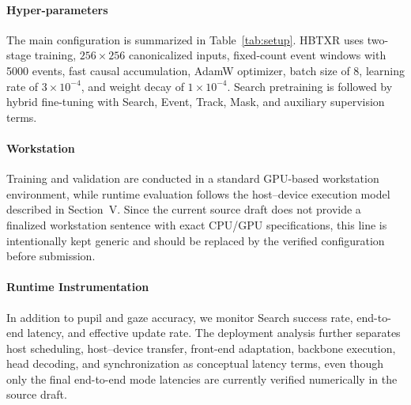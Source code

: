 \documentclass[journal]{IEEEtran}
\begin{document}
\paragraph*{Hyper-parameters}
The main configuration is summarized in Table~\ref{tab:setup}. HBTXR uses two-stage training, $256\times256$ canonicalized inputs, fixed-count event windows with 5000 events, fast causal accumulation, AdamW optimizer, batch size of 8, learning rate of $3\times10^{-4}$, and weight decay of $1\times10^{-4}$. Search pretraining is followed by hybrid fine-tuning with Search, Event, Track, Mask, and auxiliary supervision terms.

\paragraph*{Workstation}
Training and validation are conducted in a standard GPU-based workstation environment, while runtime evaluation follows the host--device execution model described in Section~V. Since the current source draft does not provide a finalized workstation sentence with exact CPU/GPU specifications, this line is intentionally kept generic and should be replaced by the verified configuration before submission.

\paragraph*{Runtime Instrumentation}
In addition to pupil and gaze accuracy, we monitor Search success rate, end-to-end latency, and effective update rate. The deployment analysis further separates host scheduling, host--device transfer, front-end adaptation, backbone execution, head decoding, and synchronization as conceptual latency terms, even though only the final end-to-end mode latencies are currently verified numerically in the source draft.
\end{document}
